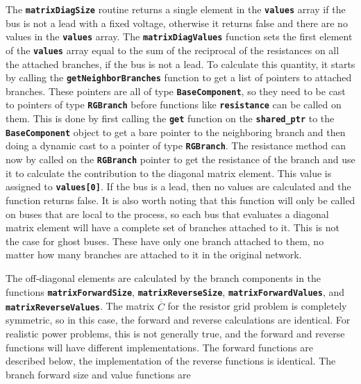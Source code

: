 \documentclass[12pt]{report} %
\begin{document}
The \texttt{\textbf{matrixDiagSize}} routine returns a single element in the \texttt{\textbf{values}} array if the bus is not a lead with a fixed voltage, otherwise it returns false and there are no values in the \texttt{\textbf{values}} array. The \texttt{\textbf{matrixDiagValues}} function sets the first element of the \texttt{\textbf{values}} array equal to the sum of the reciprocal of the resistances on all the attached branches, if the bus is not a lead. To calculate this quantity, it starts by calling the \texttt{\textbf{getNeighborBranches}} function to get a list of pointers to attached branches. These pointers are all of type \texttt{\textbf{BaseComponent}}, so they need to be cast to pointers of type \texttt{\textbf{RGBranch}} before functions like \texttt{\textbf{resistance}} can be called on them. This is done by first calling the \texttt{\textbf{get}} function on the \texttt{\textbf{shared\_ptr}} to the \texttt{\textbf{BaseComponent}} object to get a bare pointer to the neighboring branch and then doing a dynamic cast to a pointer of type \texttt{\textbf{RGBranch}}. The resistance method can now by called on the \texttt{\textbf{RGBranch}} pointer to get the resistance of the branch and use it to calculate the contribution to the diagonal matrix element. This value is assigned to \texttt{\textbf{values[0]}}. If the bus is a lead, then no values are calculated and the function returns false. It is also worth noting that this function will only be called on buses that are local to the process, so each bus that evaluates a diagonal matrix element will have a complete set of branches attached to it. This is not the case for ghost buses. These have only one branch attached to them, no matter how many branches are attached to it in the original network.

The off-diagonal elements are calculated by the branch components in the functions \texttt{\textbf{matrixForwardSize}}, \texttt{\textbf{matrixReverseSize}}, \texttt{\textbf{matrixForwardValues}}, and \texttt{\textbf{matrixReverseValues}}. The matrix $\overline{\overline{C}}$ for the resistor grid problem is completely symmetric, so in this case, the forward and reverse calculations are identical. For realistic power problems, this is not generally true, and the forward and reverse functions will have different implementations. The forward functions are described below, the implementation of the reverse functions is identical. The branch forward size and value functions are
\end{document}
